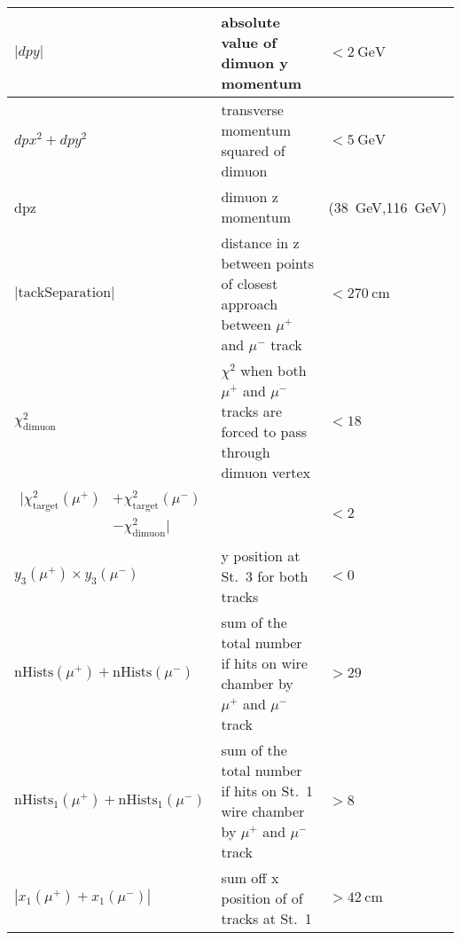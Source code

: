 \documentclass[../main.tex]{subfiles}
\begin{document}
\begin{table}[ht!]
\begin{tabular}{|m{4.5cm}|m{7cm}|m{3cm}|}
		$|dpy|$                                                                                                                           & absolute value of dimuon y   momentum                                                    & $<\SI{2}{\GeV}$                \\ \hline
		$dpx^2+dpy^2$                                                                                                                     & transverse momentum squared of   dimuon                                                  & $<\SI{5}{\GeV}$                \\ \hline
		dpz                                                                                                                               & dimuon z momentum                                                                        & (\SI{38}{\GeV},\SI{116}{\GeV}) \\ \hline
		$|\mathrm{tackSeparation}|$                                                                                                       & distance in z between points   of  closest approach between $\mu^+$   and $\mu^-$ track  & $<\SI{270}{\cm}$               \\ \hline
		$\chi^2_{\mathrm{dimuon}}$                                                                                                        & $\chi^2$ when both $\mu^+$ and   $\mu^-$ tracks are forced to pass through dimuon vertex & $<18$                          \\ \hline
		$\begin{aligned} |\chi^2_{\mathrm{target}}(\mu^+) &+ \chi^2_{\mathrm{target}}(\mu^-)\\& -\chi^2_{\mathrm{dimuon}}| \end{aligned}$ &                                                                                          & $<2$                           \\ \hline
		$y_3(\mu^+) \times y_3(\mu^-)$                                                                                                    & y position at St.~3 for both tracks                                                      & $<0$                           \\ \hline
		$\mathrm{nHists}(\mu^+)+\mathrm{nHists}(\mu^-)$                                                                                   & sum of the total number if hits on wire chamber by $\mu^+$ and $\mu^-$ track             & $>29$                          \\ \hline
		$\mathrm{nHists}_1(\mu^+)+\mathrm{nHists}_1(\mu^-)$                                                                               & sum of the total number if hits on St.~1 wire chamber by $\mu^+$ and $\mu^-$ track       & $>8$                           \\ \hline
		$|x_1(\mu^+) + x_1(\mu^-)|$                                                                                                       & sum off x position of of tracks   at St.~1                                               & $>\SI{42}{\cm}$                \\ \hline
	\end{tabular}
\end{table}
\end{document}
